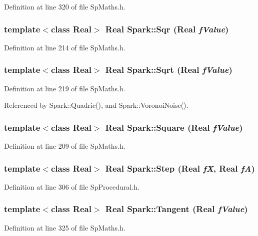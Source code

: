 Definition at line 320 of file Sp\-Maths.h.
\subsubsection{\setlength{\rightskip}{0pt plus 5cm}template$<$class Real$>$ Real Spark::Sqr (Real {\em f\-Value})}\label{namespaceSpark_a50}


Definition at line 214 of file Sp\-Maths.h.
\subsubsection{\setlength{\rightskip}{0pt plus 5cm}template$<$class Real$>$ Real Spark::Sqrt (Real {\em f\-Value})}\label{namespaceSpark_a51}


Definition at line 219 of file Sp\-Maths.h.

Referenced by Spark::Quadric(), and Spark::Voronoi\-Noise().
\subsubsection{\setlength{\rightskip}{0pt plus 5cm}template$<$class Real$>$ Real Spark::Square (Real {\em f\-Value})}\label{namespaceSpark_a49}


Definition at line 209 of file Sp\-Maths.h.
\subsubsection{\setlength{\rightskip}{0pt plus 5cm}template$<$class Real$>$ Real Spark::Step (Real {\em f\-X}, Real {\em f\-A})}\label{namespaceSpark_a59}


Definition at line 306 of file Sp\-Procedural.h.
\subsubsection{\setlength{\rightskip}{0pt plus 5cm}template$<$class Real$>$ Real Spark::Tangent (Real {\em f\-Value})}\label{namespaceSpark_a67}


Definition at line 325 of file Sp\-Maths.h.